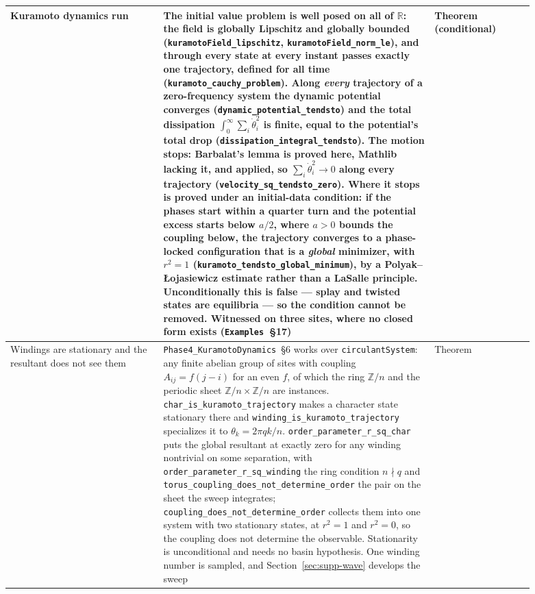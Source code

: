 \documentclass{article}
\begin{document}
\begin{longtable}{|>{\raggedright\arraybackslash}p{0.26\linewidth}|>{\raggedright\arraybackslash}p{0.46\linewidth}|>{\raggedright\arraybackslash}p{0.17\linewidth}|}
Kuramoto dynamics run & The initial value problem is well posed on all of $\mathbb{R}$: the field is globally Lipschitz and globally bounded (\nolinkurl{kuramotoField_lipschitz}, \nolinkurl{kuramotoField_norm_le}), and through every state at every instant passes exactly one trajectory, defined for all time (\nolinkurl{kuramoto_cauchy_problem}). Along \emph{every} trajectory of a zero-frequency system the dynamic potential converges (\nolinkurl{dynamic_potential_tendsto}) and the total dissipation $\int_0^\infty \sum_i \dot\theta_i^2$ is finite, equal to the potential's total drop (\nolinkurl{dissipation_integral_tendsto}). The motion stops: Barbalat's lemma is proved here, Mathlib lacking it, and applied, so $\sum_i \dot\theta_i^2 \to 0$ along every trajectory (\nolinkurl{velocity_sq_tendsto_zero}). Where it stops is proved under an initial-data condition: if the phases start within a quarter turn and the potential excess starts below $a/2$, where $a>0$ bounds the coupling below, the trajectory converges to a phase-locked configuration that is a \emph{global} minimizer, with $r^2=1$ (\nolinkurl{kuramoto_tendsto_global_minimum}), by a Polyak--\L{}ojasiewicz estimate rather than a LaSalle principle. Unconditionally this is false --- splay and twisted states are equilibria --- so the condition cannot be removed. Witnessed on three sites, where no closed form exists (\texttt{Examples}~\S17) & Theorem (conditional) \\ \hline
Windings are stationary and the resultant does not see them & \nolinkurl{Phase4_KuramotoDynamics}~\S6 works over \texttt{circulantSystem}: any finite abelian group of sites with coupling $A_{ij}=f(j-i)$ for an even $f$, of which the ring $\mathbb{Z}/n$ and the periodic sheet $\mathbb{Z}/n\times\mathbb{Z}/n$ are instances. \nolinkurl{char_is_kuramoto_trajectory} makes a character state stationary there and \nolinkurl{winding_is_kuramoto_trajectory} specializes it to $\theta_k=2\pi qk/n$. \nolinkurl{order_parameter_r_sq_char} puts the global resultant at exactly zero for any winding nontrivial on some separation, with \nolinkurl{order_parameter_r_sq_winding} the ring condition $n\nmid q$ and \nolinkurl{torus_coupling_does_not_determine_order} the pair on the sheet the sweep integrates; \nolinkurl{coupling_does_not_determine_order} collects them into one system with two stationary states, at $r^2=1$ and $r^2=0$, so the coupling does not determine the observable. Stationarity is unconditional and needs no basin hypothesis. One winding number is sampled, and Section~\ref{sec:supp-wave} develops the sweep & Theorem \\ \hline

\end{longtable}
\end{document}
